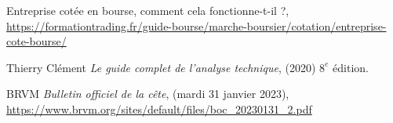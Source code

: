 \documentclass[a4paper, 12pt]{report}
\begin{document}
	
\fontsize{13}{20}
\selectfont
	
\thispagestyle{empty}
	

	 {
	
	
		\newpage
		
		\newpage
		
		\newpage
		
		\newpage
		
		
		
		\newpage
		
		\newpage 
		
   }
	\newpage
	


	\newpage
	
	
	


	\newpage
	
	
	
	
	


	\newpage
	
	
	
	\newpage

	
	\newpage
	\begin{thebibliography}{9}
		Entreprise cotée en bourse, comment cela fonctionne-t-il ?,\\ 
		\url{https://formationtrading.fr/guide-bourse/marche-boursier/cotation/entreprise-cote-bourse/}

		Thierry Clément \emph{Le guide complet de l'analyse technique}, (2020) $8^e$ édition.
		
		BRVM \emph{Bulletin officiel de la cête}, (mardi 31 janvier 2023), \\
		\url{https://www.brvm.org/sites/default/files/boc_20230131_2.pdf}


	\end{thebibliography}
	
	\newpage
	\tableofcontents
	\setcounter{tocdepth}{3}

	  
\end{document}
